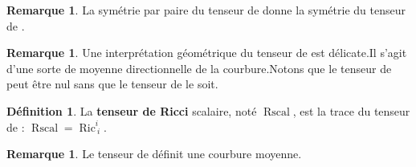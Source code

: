 \documentclass[12pt,a4paper]{article}
\DeclareMathOperator{\Ric}{Ric}
\DeclareMathOperator{\Rscal}{Rscal}
\theoremstyle{definition}
\newtheorem{defn}[thm]{Définition}
\newtheorem{rqe}[thm]{Remarque}
\begin{document}
\begin{rqe}
La symétrie par paire du tenseur de  donne la symétrie du tenseur de .
\end{rqe}
\begin{rqe}
Une interprétation géométrique du tenseur de  est délicate.\newline Il s'agit d'une sorte de moyenne directionnelle de la courbure.\newline Notons que le tenseur de  peut être nul sans que le tenseur de  le soit.
\end{rqe}
\begin{defn}
La \textbf{tenseur de Ricci} scalaire, noté $\Rscal$, est la trace du tenseur de  : $\Rscal=\Ric^i_{~i}$.
\end{defn}
\begin{rqe}
Le tenseur de  définit une courbure moyenne.
\end{rqe}
\end{document}
